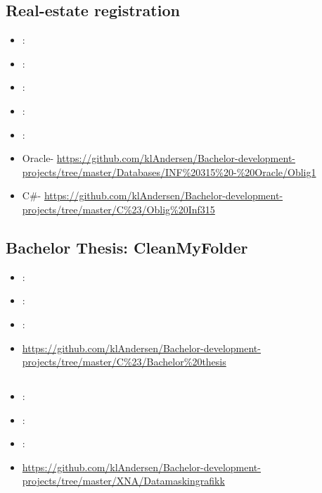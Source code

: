 \label{sec:section2}


\subsection{Real-estate registration}
\label{sec:real_estate}
\begin{itemize} 
	\item {}: 
	\item {}: 
	\item {}: 
	\item {}: 
	\item {}: 
	\item Oracle- \url{https://github.com/klAndersen/Bachelor-development-projects/tree/master/Databases/INF%20315%20-%20Oracle/Oblig1}
	\item C\#- \url{https://github.com/klAndersen/Bachelor-development-projects/tree/master/C%23/Oblig%20Inf315}
\end{itemize} 

\subsection{Bachelor Thesis: CleanMyFolder}
\label{sec:bach_thesis}

\begin{itemize} 
	\item {}: 
	\item {}: 
	\item {}: 
	\item {} \url{https://github.com/klAndersen/Bachelor-development-projects/tree/master/C%23/Bachelor%20thesis}
\end{itemize} 

\subsection[Computer Graphics]{}
\label{sec:comp_grahphics}
\begin{itemize} 
	\item {}: 
	\item {}: 
	\item {}: 
	\item {} \url{https://github.com/klAndersen/Bachelor-development-projects/tree/master/XNA/Datamaskingrafikk}
\end{itemize} 

